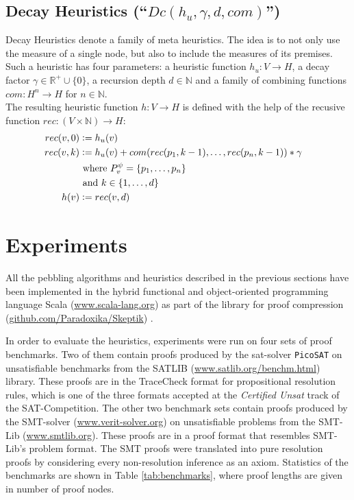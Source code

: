 \documentclass{llncs}
\newcommand{\defeq}{\mathrel{\mathop:}=}
\begin{document}
\subsection{Decay Heuristics (``$Dc(h_u,\gamma,d,com)$'') }
\label{sec:decay}
Decay Heuristics denote a family of meta heuristics. 
The idea is to not only use the measure of a single node, but also to include the measures of its premises.
Such a heuristic has four parameters: a heuristic function $h_u: V \rightarrow H$, a decay factor $\gamma \in \mathbb{R}^+ \cup \{0\}$, a recursion depth $d \in \mathbb{N}$ and a family of combining functions $com: H^n \rightarrow H$ for $n \in \mathbb{N}$.\\
The resulting heuristic function $h: V \rightarrow H$ is defined with the help of the recusive function $rec: (V \times \mathbb{N}) \rightarrow H$:
\begin{align*}
	rec(\n,0) &\defeq h_u(\n) \\
	rec(\n,k) &\defeq h_u(\n) + com(rec(p_1,k-1),\ldots,rec(p_n,k-1)) * \gamma\\
	& \text{ where } \Premises{\n}{\psi} = \{p_1,\ldots,p_n\}\\
	& \text{ and } k \in \{1,\ldots,d\} \\
	h(\n) &\defeq rec(\n,d) &
\end{align*}


\section{Experiments} 
\label{sec:exp}

All the pebbling algorithms and heuristics described in the previous sections have been implemented in the hybrid functional and object-oriented programming
language Scala (\url{www.scala-lang.org}) as part of the \skeptik library for proof compression (\url{github.com/Paradoxika/Skeptik}) \cite{ToDo:SkeptikSystemDescription}.

In order to evaluate the heuristics, experiments were run on four sets of proof benchmarks. Two of them contain proofs produced by the sat-solver \texttt{PicoSAT} \cite{Biere_picosatessentials} on unsatisfiable benchmarks from the SATLIB (\url{www.satlib.org/benchm.html}) library. These proofs are in the TraceCheck format for propositional resolution rules, which is one of the three formats accepted at the \emph{Certified Unsat} track of the SAT-Competition. 
The other two benchmark sets contain proofs produced by the SMT-solver {\veriT} (\url{www.verit-solver.org}) 
on unsatisfiable problems from the SMT-Lib (\url{www.smtlib.org}). These proofs are in a proof format that resembles SMT-Lib's problem format.
The SMT proofs were translated into pure resolution proofs by considering every non-resolution inference as an axiom.
%
Statistics of the benchmarks are shown in Table \ref{tab:benchmarks}, where proof lengths are given in number of proof nodes.
\end{document}
